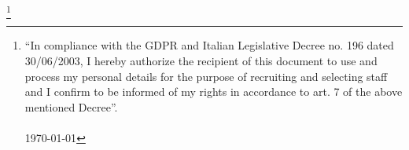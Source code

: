 \documentclass[oneside]{friggeri-cv}
\newcommand\blfootnote[1]{%
  \begingroup
  \renewcommand\thefootnote{}\footnote{#1}%
  \addtocounter{footnote}{-1}%
  \endgroup
}
\begin{document}
%
%
%
%
%
%
%
\blfootnote{“In compliance with the GDPR and Italian Legislative Decree no. 196
dated 30/06/2003, I hereby authorize the recipient of this document to use and
process my personal details for the purpose of recruiting and selecting staff
and I confirm to be informed of my rights in accordance to art. 7 of the above
mentioned Decree”.\\\\
\today}
\end{document}
